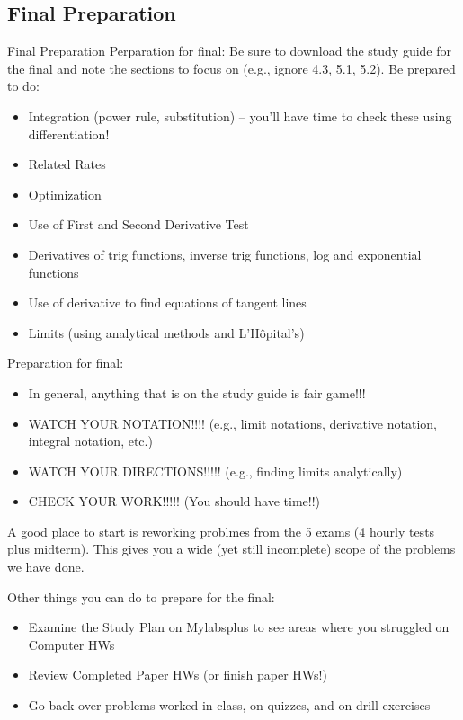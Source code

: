 \documentclass[cal1spr16Lectures.tex]{subfiles}
\begin{document}

\subsection[Final Preparation]{Final Preparation}

\begin{frame}[allowframebreaks]{Final Preparation}\footnotesize
Perparation for final: Be sure to download the study guide for the final and note the sections to focus on (e.g., ignore 4.3, 5.1, 5.2).  Be prepared to do:
\begin{itemize}\footnotesize
\item Integration (power rule, substitution) -- you'll have time to check these using differentiation!
\item Related Rates
\item Optimization
\item Use of First and Second Derivative Test
\item Derivatives of trig functions, inverse trig functions, log and exponential functions
\item Use of derivative to find equations of tangent lines
\item Limits (using analytical methods and L'H\^opital's)
\end{itemize}
\end{frame}

\begin{frame}
Preparation for final:
\begin{itemize}\small
\item In general, anything that is on the study guide is fair game!!!
\item WATCH YOUR NOTATION!!!! (e.g., limit notations, derivative notation, integral notation, etc.)
\item WATCH YOUR DIRECTIONS!!!!! (e.g., finding limits analytically)
\item CHECK YOUR WORK!!!!! (You should have time!!)
\end{itemize}
\end{frame}

\begin{frame}\small
A good place to start is reworking problmes from the 5 exams (4 hourly tests plus midterm).  This gives you a wide (yet still incomplete) scope of the problems we have done.

\vspace{0.5pc}
Other things you can do to prepare for the final:
\begin{itemize}\footnotesize
\item Examine the Study Plan on Mylabsplus to see areas where you struggled on Computer HWs
\item Review Completed Paper HWs (or finish paper HWs!)
\item Go back over problems worked in class, on quizzes, and on drill exercises
\end{itemize}
\end{frame}
\end{document}
